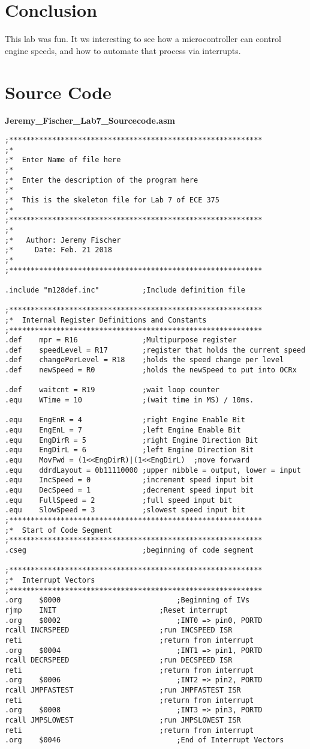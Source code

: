 \documentclass[12pt,letterpaper]{article}
\begin{document}
\section{Conclusion}
		This lab was fun.
		It ws interesting to see how a microcontroller can control engine speeds, and how to automate that process via interrupts.

\section{Source Code}
	\textbf{Jeremy\_Fischer\_Lab7\_Sourcecode.asm}
	\begin{verbatim}
;***********************************************************
;*
;*	Enter Name of file here
;*
;*	Enter the description of the program here
;*
;*	This is the skeleton file for Lab 7 of ECE 375
;*
;***********************************************************
;*
;*	 Author: Jeremy Fischer
;*	   Date: Feb. 21 2018
;*
;***********************************************************

.include "m128def.inc"			;Include definition file

;***********************************************************
;*	Internal Register Definitions and Constants
;***********************************************************
.def	mpr = R16				;Multipurpose register
.def	speedLevel = R17		;register that holds the current speed
.def	changePerLevel = R18	;holds the speed change per level
.def	newSpeed = R0			;holds the newSpeed to put into OCRx

.def  	waitcnt = R19			;wait loop counter
.equ  	WTime = 10				;(wait time in MS) / 10ms.

.equ	EngEnR = 4				;right Engine Enable Bit
.equ	EngEnL = 7				;left Engine Enable Bit
.equ	EngDirR = 5				;right Engine Direction Bit
.equ	EngDirL = 6				;left Engine Direction Bit
.equ  	MovFwd = (1<<EngDirR)|(1<<EngDirL)  ;move forward
.equ    ddrdLayout = 0b11110000	;upper nibble = output, lower = input
.equ  	IncSpeed = 0			;increment speed input bit
.equ  	DecSpeed = 1			;decrement speed input bit
.equ  	FullSpeed = 2			;full speed input bit
.equ  	SlowSpeed = 3			;slowest speed input bit
;***********************************************************
;*	Start of Code Segment
;***********************************************************
.cseg							;beginning of code segment

;***********************************************************
;*	Interrupt Vectors
;***********************************************************
.org	$0000							;Beginning of IVs
rjmp 	INIT						;Reset interrupt
.org	$0002							;INT0 => pin0, PORTD
rcall INCRSPEED						;run INCSPEED ISR
reti								;return from interrupt
.org	$0004							;INT1 => pin1, PORTD
rcall DECRSPEED						;run DECSPEED ISR
reti								;return from interrupt
.org	$0006							;INT2 => pin2, PORTD
rcall JMPFASTEST					;run JMPFASTEST ISR
reti								;return from interrupt
.org	$0008							;INT3 => pin3, PORTD
rcall JMPSLOWEST					;run JMPSLOWEST ISR
reti								;return from interrupt
.org	$0046							;End of Interrupt Vectors


\end{verbatim}
\end{document}
